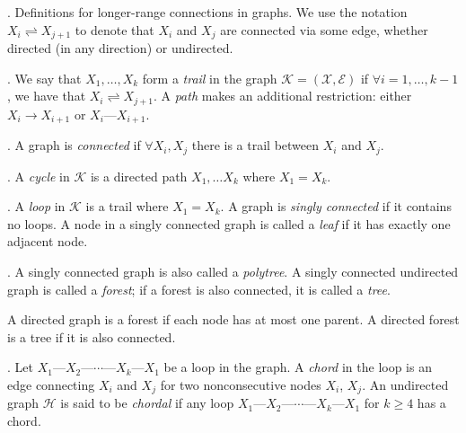 \documentclass[11pt]{article}
\newcommand\myspace[1][]{\vspace{#1\bigskipamount}}
\newcommand\p{\Needspace{10\baselineskip} \noindent}
\begin{document}
\myspace
\p {}. Definitions for longer-range connections in graphs. We use the notation $X_i \rightleftharpoons X_{j+1}$ to denote that $X_i$ and $X_j$ are connected via some edge, whether directed (in any direction) or undirected. 
\begin{compactitem}
	\item {}. We say that $X_1, \ldots, X_k$ form a \textit{trail} in the graph $\mathcal K = (\mathcal X, \mathcal E)$ if $\forall i = 1, \ldots, k - 1$, we have that $X_i \rightleftharpoons X_{j + 1}$. A \textit{path} makes an additional restriction: either $X_i \rightarrow X_{i + 1}$ or $X_i \text{---} X_{i + 1}$.
	
	\item {}. A graph is \textit{connected} if $\forall X_i, X_j$ there is a trail between $X_i$ and $X_j$. 
	
	\item {}. A \textit{cycle} in $\mathcal K$ is a directed path $X_1, \ldots X_k$ where $X_1 = X_k$. 
	
	\item {}. A \textit{loop} in $\mathcal K$ is a trail where $X_1 = X_k$. A graph is \textit{singly connected} if it contains no loops. A node in a singly connected graph is called a \textit{leaf} if it has exactly one adjacent node. 
	
	\item {}. A singly connected graph is also called a \textit{polytree}. A singly connected undirected graph is called a \textit{forest}; if a forest is also connected, it is called a \textit{tree}.
	\begin{compactitem}
		\item A directed graph is a forest if each node has at most one parent. A directed forest is a tree if it is also connected.
	\end{compactitem} 
	
	\item {}. Let $X_1 \text{---} X_2 \text{---} \cdots \text{---} X_k \text{---} X_1$ be a loop in the graph. A \textit{chord} in the loop is an edge connecting $X_i$ and $X_j$ for two nonconsecutive nodes $X_i$, $X_j$. An undirected graph $\mathcal H$ is said to be \textit{chordal} if any loop $X_1 \text{---} X_2 \text{---} \cdots \text{---} X_k \text{---} X_1$ for $k \ge 4$ has a chord. 
\end{compactitem}
\end{document}
